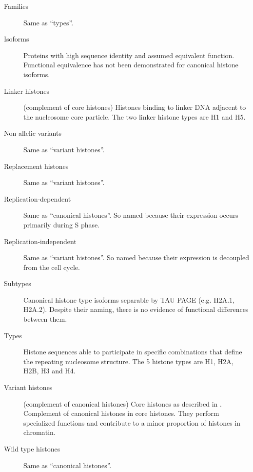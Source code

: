{\begin{shaded}
\begin{description}
        \item[Families] \hfill \newline
        Same as ``types''.

        \item[Isoforms] \hfill \newline
        Proteins with high sequence identity and assumed equivalent function.
        Functional equivalence has not been demonstrated for canonical histone isoforms.

        \item[Linker histones] (complement of core histones)\hfill \newline
        Histones binding to linker DNA adjacent to the nucleosome core particle.
        The two linker histone types are H1 and H5.

        \item[Non-allelic variants] \hfill \newline
        Same as ``variant histones''.

        \item[Replacement histones] \hfill \newline
        Same as ``variant histones''.

        \item[Replication-dependent] \hfill \newline
        Same as ``canonical histones''.  So named because their expression
        occurs primarily during S phase.

        \item[Replication-independent] \hfill \newline
        Same as ``variant histones''.  So named because their expression is
        decoupled from the cell cycle.

        \item[Subtypes] \hfill \newline
        Canonical histone type isoforms separable by TAU PAGE
        (e.g. H2A.1, H2A.2).  Despite their naming, there is no evidence of
        functional differences between them.

        \item[Types] \hfill \newline
        Histone sequences able to participate in specific combinations
        that define the repeating nucleosome structure.
        The 5 histone types are H1, H2A, H2B, H3 and H4.

        \item[Variant histones] (complement of canonical histones)\hfill \newline
        Core histones as described in .
        Complement of canonical histones in core histones.  They perform
        specialized functions and contribute to a minor proportion of
        histones in chromatin.

        \item[Wild type histones] \hfill \newline
        Same as ``canonical histones''.
      \end{description}
    \end{shaded}
  }

